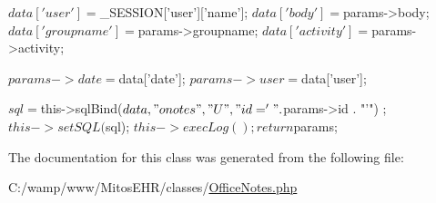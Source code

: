 \begin{DoxyCode}
                                                       {

        $data['user']       = $_SESSION['user']['name'];
        $data['body']       = $params->body;
        $data['groupname']  = $params->groupname;
        $data['activity']   = $params->activity;

        $params->date = $data['date'];
        $params->user = $data['user'];

        $sql = $this->sqlBind($data, "onotes", "U", "id='" . $params->id . "'")
      ;
        $this->setSQL($sql);
        $this->execLog();

        return $params;
    }
\end{DoxyCode}


\-The documentation for this class was generated from the following file\-:\begin{DoxyCompactItemize}
\item 
\-C\-:/wamp/www/\-Mitos\-E\-H\-R/classes/\hyperlink{_office_notes_8php}{\-Office\-Notes.\-php}\end{DoxyCompactItemize}
